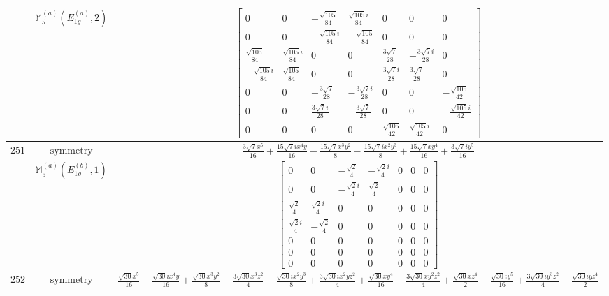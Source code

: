 \documentclass[fleqn,8pt,landscape]{jsarticle}
\begin{document}
\begin{longtable}{ccc}
$  $ & $ \mathbb{M}_{5}^{(a)}(E_{1g}^{(a)},2) $ & $ \begin{bmatrix} 0 & 0 & - \frac{\sqrt{105}}{84} & \frac{\sqrt{105} i}{84} & 0 & 0 & 0 \\ 0 & 0 & - \frac{\sqrt{105} i}{84} & - \frac{\sqrt{105}}{84} & 0 & 0 & 0 \\ \frac{\sqrt{105}}{84} & \frac{\sqrt{105} i}{84} & 0 & 0 & \frac{3 \sqrt{7}}{28} & - \frac{3 \sqrt{7} i}{28} & 0 \\ - \frac{\sqrt{105} i}{84} & \frac{\sqrt{105}}{84} & 0 & 0 & \frac{3 \sqrt{7} i}{28} & \frac{3 \sqrt{7}}{28} & 0 \\ 0 & 0 & - \frac{3 \sqrt{7}}{28} & - \frac{3 \sqrt{7} i}{28} & 0 & 0 & - \frac{\sqrt{105}}{42} \\ 0 & 0 & \frac{3 \sqrt{7} i}{28} & - \frac{3 \sqrt{7}}{28} & 0 & 0 & - \frac{\sqrt{105} i}{42} \\ 0 & 0 & 0 & 0 & \frac{\sqrt{105}}{42} & \frac{\sqrt{105} i}{42} & 0 \end{bmatrix} $ \\ \hline
$ 251 $ & $ \text{symmetry} $ & $ \frac{3 \sqrt{7} x^{5}}{16} + \frac{15 \sqrt{7} i x^{4} y}{16} - \frac{15 \sqrt{7} x^{3} y^{2}}{8} - \frac{15 \sqrt{7} i x^{2} y^{3}}{8} + \frac{15 \sqrt{7} x y^{4}}{16} + \frac{3 \sqrt{7} i y^{5}}{16} $ \\
$  $ & $ \mathbb{M}_{5}^{(a)}(E_{1g}^{(b)},1) $ & $ \begin{bmatrix} 0 & 0 & - \frac{\sqrt{2}}{4} & - \frac{\sqrt{2} i}{4} & 0 & 0 & 0 \\ 0 & 0 & - \frac{\sqrt{2} i}{4} & \frac{\sqrt{2}}{4} & 0 & 0 & 0 \\ \frac{\sqrt{2}}{4} & \frac{\sqrt{2} i}{4} & 0 & 0 & 0 & 0 & 0 \\ \frac{\sqrt{2} i}{4} & - \frac{\sqrt{2}}{4} & 0 & 0 & 0 & 0 & 0 \\ 0 & 0 & 0 & 0 & 0 & 0 & 0 \\ 0 & 0 & 0 & 0 & 0 & 0 & 0 \\ 0 & 0 & 0 & 0 & 0 & 0 & 0 \end{bmatrix} $ \\ \hline
$ 252 $ & $ \text{symmetry} $ & $ \frac{\sqrt{30} x^{5}}{16} - \frac{\sqrt{30} i x^{4} y}{16} + \frac{\sqrt{30} x^{3} y^{2}}{8} - \frac{3 \sqrt{30} x^{3} z^{2}}{4} - \frac{\sqrt{30} i x^{2} y^{3}}{8} + \frac{3 \sqrt{30} i x^{2} y z^{2}}{4} + \frac{\sqrt{30} x y^{4}}{16} - \frac{3 \sqrt{30} x y^{2} z^{2}}{4} + \frac{\sqrt{30} x z^{4}}{2} - \frac{\sqrt{30} i y^{5}}{16} + \frac{3 \sqrt{30} i y^{3} z^{2}}{4} - \frac{\sqrt{30} i y z^{4}}{2} $ \\

\end{longtable}
\end{document}
